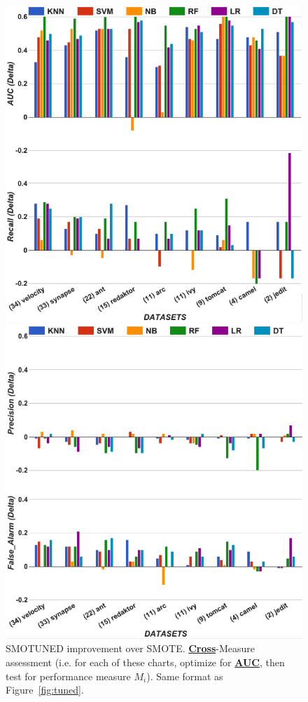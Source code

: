 \documentclass[10pt,conference]{IEEEtran}
\theoremstyle{break}
\theoremstyle{break}
\begin{document}
\begin{figure}[!htbp]
\begin{minipage}{.5\linewidth}
\centering
        \includegraphics[width=.95\linewidth]{./fig/AUC_auc1.png}
    \end{minipage}%
\begin{minipage}{.5\linewidth}
        \centering
        \includegraphics[width=.95\linewidth]{./fig/AUC_prec.png}
    \end{minipage}%
    
    \caption{ SMOTUNED improvement over SMOTE. 
    \underline{{\bf Cross}}-Measure
    assessment (i.e. for each of these charts,
    optimize for \underline{{\bf AUC}}, then test for
    performance measure $M_i$).  Same format as
    Figure~\ref{fig:tuned}.}
    \label{fig:auc}
\vspace{-0.6cm}
\end{figure} 
\end{document}

